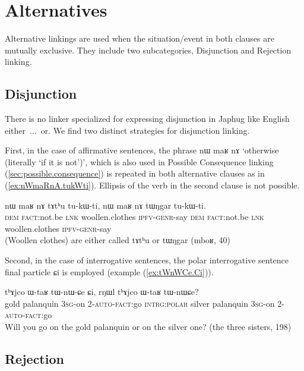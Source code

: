\documentclass[oldfontcommands,oneside,a4paper,11pt]{article}
\newcommand{\ipa}[1]{{\phon \mbox{#1}}} %
\newcommand{\refb}[1]{(\ref{#1})}
\begin{document}
\section{Alternatives}
Alternative linkings are used when the situation/event in both clauses are mutually exclusive. They include two subcategories,  Disjunction and Rejection linking.  
\subsection{Disjunction}
There is no linker specialized for expressing disjunction in Japhug like English \ipa{either ... or}. We find two distinct strategies for disjunction linking.

First, in the case of affirmative sentences, the phrase \ipa{nɯ}    	\ipa{maʁ}    	\ipa{nɤ}  `otherwise (literally `if it is not')', which is also used in Possible Consequence linking \refb{sec:possible.consequence} is repeated in both alternative clauses as in \refb{ex:nWmaRnA.tukWti}. Ellipsis of the verb in the second clause  is not possible.
\begin{exe}
\ex \label{ex:nWmaRnA.tukWti}
\gll 
\ipa{nɯ}    	\ipa{maʁ}    	\ipa{nɤ}    	\ipa{tɤtʰu}    	\ipa{tu-kɯ-ti,}    	\ipa{nɯ}    	\ipa{maʁ}    	\ipa{nɤ}    	\ipa{tɯŋgar}    	\ipa{tu-kɯ-ti.}    \\
\textsc{dem} \textsc{fact:}not.be \textsc{lnk} woollen.clothes \textsc{ipfv-genr}-say \textsc{dem} \textsc{fact:}not.be \textsc{lnk} woollen.clothes \textsc{ipfv-genr}-say \\
\glt (Woollen clothes) are either called \ipa{tɤtʰu}  or \ipa{tɯŋgar}    (mboʁ, 40)
 \end{exe}

Second, in the case of interrogative sentences, the polar interrogative sentence final particle \ipa{ɕi} is employed (example \refb{ex:tWnWCe.Ci}).

\begin{exe}
\ex \label{ex:tWnWCe.Ci}
\gll \ipa{χsɤr}    	\ipa{tʰɤjco}    	\ipa{ɯ-taʁ}    	\ipa{tɯ-nɯ-ɕe}    	\ipa{ɕi,}    	\ipa{rŋɯl}    	\ipa{tʰɤjco}    	\ipa{ɯ-taʁ}    	\ipa{tɯ-nɯɕe?}    	\\
gold palanquin \textsc{3sg}-on \textsc{2-auto-fact}:go \textsc{intrg:polar} silver palanquin \textsc{3sg}-on \textsc{2-auto-fact}:go \\
\glt Will you go on the gold palanquin or on the silver one? (the three sisters, 198)
 \end{exe}
 
\subsection{Rejection} \label{sec:rejection}
\end{document}

